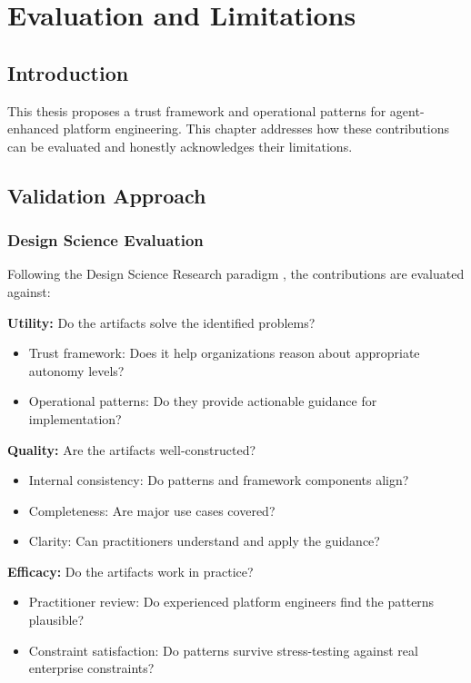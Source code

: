 \chapter{Evaluation and Limitations}
\label{ch:evaluation}


\section{Introduction}
\label{sec:evaluation-intro}

This thesis proposes a trust framework and operational patterns for agent-enhanced platform engineering. This chapter addresses how these contributions can be evaluated and honestly acknowledges their limitations.

\section{Validation Approach}
\label{sec:validation-approach}

\subsection{Design Science Evaluation}
\label{subsec:design-science-evaluation}

Following the Design Science Research paradigm \citep{hevner2004,peffers2007}, the contributions are evaluated against:

\textbf{Utility:} Do the artifacts solve the identified problems?
\begin{itemize}
    \item Trust framework: Does it help organizations reason about appropriate autonomy levels?
    \item Operational patterns: Do they provide actionable guidance for implementation?
\end{itemize}

\textbf{Quality:} Are the artifacts well-constructed?
\begin{itemize}
    \item Internal consistency: Do patterns and framework components align?
    \item Completeness: Are major use cases covered?
    \item Clarity: Can practitioners understand and apply the guidance?
\end{itemize}

\textbf{Efficacy:} Do the artifacts work in practice?
\begin{itemize}
    \item Practitioner review: Do experienced platform engineers find the patterns plausible?
    \item Constraint satisfaction: Do patterns survive stress-testing against real enterprise constraints?
\end{itemize}

